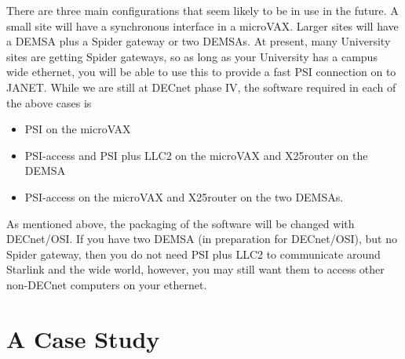 There are three  main configurations that seem likely to be in
use in the future. A small site will have a synchronous interface in a
microVAX. Larger sites will have a DEMSA plus a Spider gateway or two
DEMSAs. At present, many University sites are getting Spider gateways, so
as long as your University has a campus wide ethernet, you will be able
to use this to provide a fast PSI connection on to JANET. While we are
still at DECnet phase IV, the software required in each of the above
cases is

\begin{itemize}
\item PSI on the microVAX
\item PSI-access and PSI plus LLC2 on the microVAX and X25router on the DEMSA
\item PSI-access on the microVAX and X25router on the two DEMSAs.
\end{itemize}

As mentioned above, the packaging of the software will be changed with
DECnet/OSI. If you have two DEMSA (in preparation for DECnet/OSI), but no
Spider gateway, then you do not need PSI plus LLC2 to communicate around
Starlink and the wide world, however, you may still want them to access other
non-DECnet computers on your ethernet.

\section{A Case Study}

